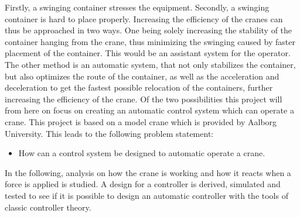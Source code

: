 
Firstly, a swinging container stresses the equipment. Secondly, a swinging container is hard to place properly. Increasing the efficiency of the cranes can thus be approached in two ways. One being solely increasing the stability of the container hanging from the crane, thus minimizing the swinging caused by faster placement of the container. This would be an assistant system for the operator. The other method is an automatic system, that not only stabilizes the container, but also optimizes the route of the container, as well as the acceleration and deceleration to get the fastest possible relocation of the containers, further increasing the efficiency of the crane.
Of the two possibilities this project will from here on focus on creating an automatic control system which can operate a crane. This project is based on a model crane which is provided by Aalborg University. This leads to the following problem statement:

\begin{itemize}
\item How can a control system be designed to automatic operate a crane.
\end{itemize}

In the following, analysis on how the crane is working and how it reacts when a force is applied is studied. A design for a controller is derived, simulated and tested to see if it is possible to design an automatic controller with the tools of classic controller theory. 
